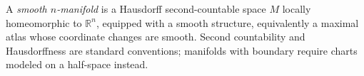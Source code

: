 
A \emph{smooth $n$-manifold} is a Hausdorff second-countable space $M$ locally homeomorphic to $\mathbb R^n$, equipped with a smooth structure, equivalently a maximal atlas whose coordinate changes are smooth. Second countability and Hausdorffness are standard conventions; manifolds with boundary require charts modeled on a half-space instead.
